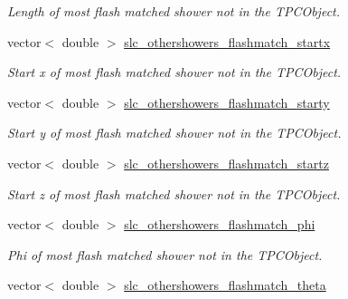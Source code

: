 \begin{DoxyCompactItemize}
\begin{DoxyCompactList}\small\item\em Length of most flash matched shower not in the T\-P\-C\-Object. \end{DoxyCompactList}\item 
\hypertarget{classUBXSecEvent_a4bdafa4c1c48aec36f61c84b9bc6260b}{vector$<$ double $>$ \hyperlink{classUBXSecEvent_a4bdafa4c1c48aec36f61c84b9bc6260b}{slc\-\_\-othershowers\-\_\-flashmatch\-\_\-startx}}\label{classUBXSecEvent_a4bdafa4c1c48aec36f61c84b9bc6260b}

\begin{DoxyCompactList}\small\item\em Start x of most flash matched shower not in the T\-P\-C\-Object. \end{DoxyCompactList}\item 
\hypertarget{classUBXSecEvent_a074df868594e6f1d0ad7ee5557203a8a}{vector$<$ double $>$ \hyperlink{classUBXSecEvent_a074df868594e6f1d0ad7ee5557203a8a}{slc\-\_\-othershowers\-\_\-flashmatch\-\_\-starty}}\label{classUBXSecEvent_a074df868594e6f1d0ad7ee5557203a8a}

\begin{DoxyCompactList}\small\item\em Start y of most flash matched shower not in the T\-P\-C\-Object. \end{DoxyCompactList}\item 
\hypertarget{classUBXSecEvent_adcfffc2605d88cf7ca7e6f76f428b809}{vector$<$ double $>$ \hyperlink{classUBXSecEvent_adcfffc2605d88cf7ca7e6f76f428b809}{slc\-\_\-othershowers\-\_\-flashmatch\-\_\-startz}}\label{classUBXSecEvent_adcfffc2605d88cf7ca7e6f76f428b809}

\begin{DoxyCompactList}\small\item\em Start z of most flash matched shower not in the T\-P\-C\-Object. \end{DoxyCompactList}\item 
\hypertarget{classUBXSecEvent_acedb7f202a34d1182531876512bb6978}{vector$<$ double $>$ \hyperlink{classUBXSecEvent_acedb7f202a34d1182531876512bb6978}{slc\-\_\-othershowers\-\_\-flashmatch\-\_\-phi}}\label{classUBXSecEvent_acedb7f202a34d1182531876512bb6978}

\begin{DoxyCompactList}\small\item\em Phi of most flash matched shower not in the T\-P\-C\-Object. \end{DoxyCompactList}\item 
\hypertarget{classUBXSecEvent_a75fb77bfd093fbed3509d7e632641cf4}{vector$<$ double $>$ \hyperlink{classUBXSecEvent_a75fb77bfd093fbed3509d7e632641cf4}{slc\-\_\-othershowers\-\_\-flashmatch\-\_\-theta}}\label{classUBXSecEvent_a75fb77bfd093fbed3509d7e632641cf4}


\end{DoxyCompactItemize}
